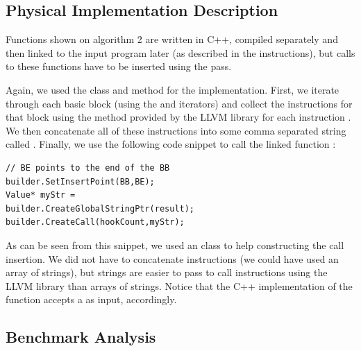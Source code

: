 \subsection{Physical Implementation Description}

Functions shown on algorithm 2 are written in C++, compiled separately and then linked to the input program later (as described in the instructions), but calls to these functions have to be inserted using the  pass.

Again, we used the  class and  method for the implementation. First, we iterate through each basic block (using the  and  iterators) and collect the instructions for that block using the  method provided by the LLVM library for each instruction . We then concatenate all of these instructions into some comma separated string called . Finally, we use the following code snippet to call the linked function :

\begin{frame}[fragile]
\begin{lstlisting}
// BE points to the end of the BB
builder.SetInsertPoint(BB,BE);
Value* myStr = 
builder.CreateGlobalStringPtr(result);
builder.CreateCall(hookCount,myStr);
\end{lstlisting}
\end{frame}
As can be seen from this snippet, we used an  class to help constructing the call insertion. We did not have to concatenate instructions (we could have used an array of strings), but strings are easier to pass to call instructions using the LLVM library than arrays of strings. Notice that the C++ implementation of the  function accepts a  as input, accordingly.

\subsection{Benchmark Analysis}

